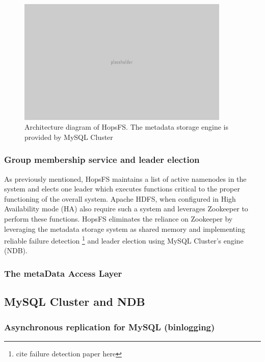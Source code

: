 \begin{figure}[h]
\caption{Architecture diagram of HopsFS. The metadata storage engine is provided by MySQL Cluster}
\label{fig:hopsfs-architecture}
\centering
\includegraphics[width=0.9\textwidth]{images/placeholder.png}
\end{figure}

\subsubsection{Group membership service and leader election}
\label{sec:leader-election}
As previously mentioned, HopsFS maintains a list of active namenodes in the system and elects one leader which executes functions critical to the proper functioning of the overall system.
Apache HDFS, when configured in High Availability mode (HA) also require such a system and leverages Zookeeper to perform these functions.
HopsFS eliminates the reliance on Zookeeper by leveraging the metadata storage system as shared memory and implementing reliable failure detection \footnote{cite failure detection paper here} and leader election \cite{DBLP:conf/dais/NiaziIBD15} using MySQL Cluster's engine (NDB).


\subsubsection{The metaData Access Layer}


\subsection{MySQL Cluster and NDB}
\subsubsection{Asynchronous replication for MySQL (binlogging)}
